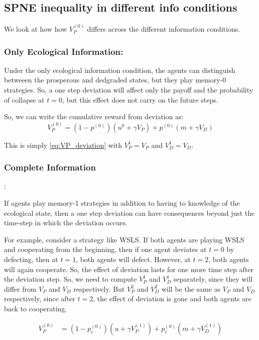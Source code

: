 \documentclass{article}
\begin{document}
\subsection{SPNE inequality in different info conditions}

We look at how how $V_P^{(0)}$ differs across the different information conditions.

\subsubsection{Only Ecological Information: }

Under the only ecological information condition, the agents can distinguish betweeen the prosperous and dedgraded states, but they play memory-0 strategies.
So, a one step deviation will affect only the payoff and the probability of collapse at $t=0$, but this effect does not carry on the future steps.

So, we can write the cumulative reward from deviation as:
\begin{equation}
    V_P^{(0)} = (1-p^{(0)})(u^0 + \gamma V_P) + p^{(0)}(m + \gamma V_D) 
\end{equation}

This is simply \ref{eq:VP_deviation} with $V_P^{1} = V_P$ and $V_D^{1} = V_D$.

\subsubsection{Complete Information}:

If agents play memory-1 strategies in addition to having to knowledge of the ecological state, 
then a one step deviation can have consequences beyond just the time-step in which the deviation occurs.

For example, consider a strategy like WSLS. If both agents are playing WSLS and cooperating from the beginning, then if one agent deviates at $t=0$ by defecting, then at $t=1$, both agents will defect.
However, at $t=2$, both agents will again cooperate. So, the effect of deviation lasts for one more time step after the deviation step. 
So, we need to compute $V_P^{1}$ and $V_D^{1}$ separately, since they will differ from $V_P$ and $V_D$ respectively. But $V_P^{2}$ and $V_D^{2}$ will be the same as $V_P$ and $V_D$ respectively, since after $t=2$, the effect of deviation is gone and both agents are back to cooperating.

\begin{equation}\label{V_P_deviation_with_t_1}
\begin{aligned}
    V_{P}^{(0)} &= \left(1 - p_{c}^{(0)}\right)\left( u + \gamma V_{P}^{(1)} \right) 
    + p_{c}^{(0)}\left( m + \gamma V_{D}^{(1)} \right)
\end{aligned}
\end{equation}
\end{document}
